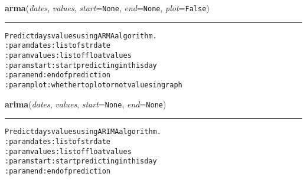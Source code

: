     \vspace{0.5ex}

\hspace{.8\funcindent}\begin{boxedminipage}{\funcwidth}

    \raggedright \textbf{arma}(\textit{dates}, \textit{values}, \textit{start}={\tt None}, \textit{end}={\tt None}, \textit{plot}={\tt False})

    \vspace{-1.5ex}

    \rule{\textwidth}{0.5\fboxrule}
\setlength{\parskip}{2ex}
\begin{alltt}
Predict days values using ARMA algorithm.
:param dates: list of str date
:param values: list of float values
:param start: start predicting in this day
:param end: end of prediction
:param plot: whether to plot or not values in graph 
\end{alltt}

\setlength{\parskip}{1ex}
    \end{boxedminipage}

    \label{hal:ml:models:time_series:arima}

    \vspace{0.5ex}

\hspace{.8\funcindent}\begin{boxedminipage}{\funcwidth}

    \raggedright \textbf{arima}(\textit{dates}, \textit{values}, \textit{start}={\tt None}, \textit{end}={\tt None})

    \vspace{-1.5ex}

    \rule{\textwidth}{0.5\fboxrule}
\setlength{\parskip}{2ex}
\begin{alltt}
Predict days values using ARIMA algorithm.
:param dates: list of str date
:param values: list of float values
:param start: start predicting in this day
:param end: end of prediction 
\end{alltt}

\setlength{\parskip}{1ex}
    \end{boxedminipage}

    \label{hal:ml:models:time_series:var}

